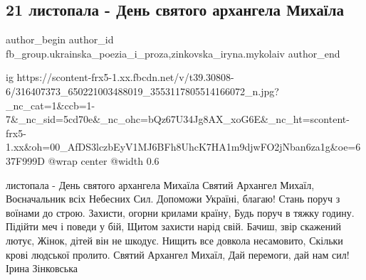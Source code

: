  
 
 
 
 
 
\subsection{21 листопала - День святого архангела Михаїла}
\label{sec:21_11_2022.fb.fb_group.ukrainska_poezia_i_proza.1.arhangel_mihail}
 
\ifcmt
 author_begin
   author_id fb_group.ukrainska_poezia_i_proza,zinkovska_iryna.mykolaiv
 author_end
\fi

\ifcmt
  ig https://scontent-frx5-1.xx.fbcdn.net/v/t39.30808-6/316407373_650221003488019_3553117805514166072_n.jpg?_nc_cat=1&ccb=1-7&_nc_sid=5cd70e&_nc_ohc=bQz67U34Jg8AX_xoG6E&_nc_ht=scontent-frx5-1.xx&oh=00_AfDS3lczbEyV1MJ6BFh8UhcK7HA1m9djwFO2jNban6za1g&oe=637F999D
  @wrap center
  @width 0.6
\fi

\obeycr
{} листопала - День святого архангела Михаїла
\smallskip
Святий Архангел Михаїл,
Воєначальник всіх Небесних Сил.
Допоможи Україні, благаю!
Стань поруч з воїнами до строю.
Захисти, огорни крилами країну,
Будь поруч в тяжку годину.
Підійти меч і поведи у бій,
Щитом захисти нарід свій.
Бачиш, звір скажений лютує,
Жінок, дітей він не шкодує.
Нищить все довкола несамовито,
Скільки крові людської пролито.
Святий Архангел Михаїл,
Дай перемоги, дай нам сил! 
\smallskip
Ірина Зінковська
\restorecr

